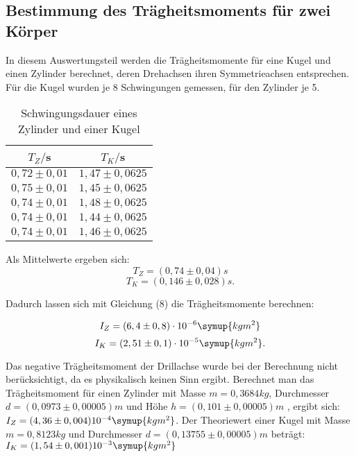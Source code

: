 \subsection{Bestimmung des Trägheitsmoments für zwei Körper}
In diesem Auswertungsteil werden die Trägheitsmomente für eine Kugel und einen 
Zylinder berechnet, deren Drehachsen ihren Symmetrieachsen entsprechen.
Für die Kugel wurden je 8 Schwingungen gemessen, für den Zylinder je 5.
\begin{table}[H]
  \centering
  \caption{Schwingungsdauer eines Zylinder und einer Kugel}
  \label{tab:Schwingungsdauer von Zylinder und Kugel}
  \begin{tabular}{c c}
    \toprule
    $T_Z/$s & $T_K/$s \\
    \midrule
    $0,72 \pm 0,01$ & $1,47\pm 0,0625$ \\
    $0,75 \pm 0,01$ & $1,45\pm 0,0625$ \\
    $0,74 \pm 0,01$ & $1,48\pm 0,0625$ \\
    $0,74 \pm 0,01$ & $1,44\pm 0,0625$ \\
    $0,74 \pm 0,01$ & $1,46\pm 0,0625$ \\
  
    \bottomrule
  \end{tabular}
\end{table}

Als Mittelwerte ergeben sich:
\begin{equation}
T_Z = (0,74 \pm 0,04) s
\end{equation}
\begin{equation}
T_K = (0,146 \pm 0,028) s.
\end{equation}



Dadurch lassen sich mit Gleichung (8) die Trägheitsmomente berechnen:

\begin{equation}
I_Z = (6,4 \pm 0,8)\cdot 10^{-6} \symup{kgm^2}
\end{equation}
\begin{equation}
I_K = (2,51 \pm 0,1)\cdot 10^{-5} \symup{kgm^2} .
\end{equation}

Das negative Trägheitsmoment der Drillachse wurde bei der Berechnung nicht berücksichtigt,
da es physikalisch keinen Sinn ergibt. 
Berechnet man das Trägheitsmoment für einen Zylinder mit Masse $m = 0,3684 kg$, Durchmesser $d = (0,0973 \pm 0,00005) m$
und Höhe $h = (0,101 \pm 0,00005) m$ , ergibt sich: $I_Z =(4,36 \pm 0,004)10^{-4} \symup{kgm^2}$.
Der Theoriewert einer Kugel mit Masse $ m = 0,8123 kg$ und Durchmesser $ d = (0,13755 \pm 0,00005) m$
beträgt: $I_K = (1,54 \pm 0,001)10^{-3} \symup{kgm^2}$





